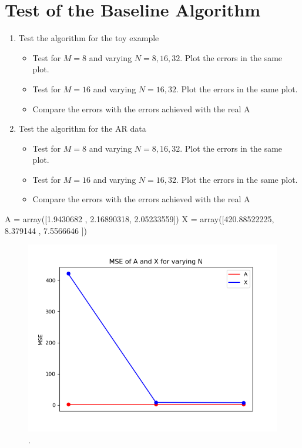 \section{Test of the Baseline Algorithm}
\begin{enumerate}
\item Test the algorithm for the toy example
	\begin{itemize}
	\item Test for $M = 8$ and varying $N = 8, 16, 32$. Plot the errors in the same plot.
	\item Test for $M = 16$ and varying $N = 16, 32$. Plot the errors in the same plot.
	\item Compare the errors with the errors achieved with the real A
	\end{itemize}	 
\item Test the algorithm for the AR data
	\begin{itemize}
	\item Test for $M = 8$ and varying $N = 8, 16, 32$. Plot the errors in the same plot.
	\item Test for $M = 16$ and varying $N = 16, 32$. Plot the errors in the same plot.
	\item Compare the errors with the errors achieved with the real A
	\end{itemize}	
\end{enumerate}   

A = array([1.9430682 , 2.16890318, 2.05233559])
X = array([420.88522225,   8.379144  ,   7.5566646 ])
\begin{figure}[H]
\centering
\includegraphics[scale=0.5]{figures/chapter6/AR_Error_vary_n_m8_L1000.png}
\caption{.}
\label{fig:}
\end{figure}
\noindent


